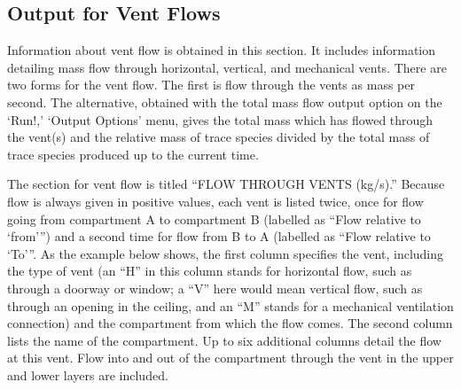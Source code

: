 \subsection{Output for Vent Flows}
Information about vent flow is obtained in this section.  It includes information detailing mass flow through horizontal, vertical, and mechanical vents. There are two forms for the vent flow. The first is flow through the vents as mass per second. The alternative, obtained with the total mass flow output option on the `Run!,' `Output Options' menu, gives the total mass which has flowed through the vent(s) and the relative mass of trace species divided by the total mass of trace species produced up to the current time.

The section for vent flow is titled ``FLOW THROUGH VENTS (kg/s).''  Because flow is always given in positive values, each vent is listed twice, once for flow going from compartment A to compartment B (labelled as ``Flow relative to `from''') and a second time for flow from B to A (labelled as ``Flow relative to `To'''.  As the example below shows, the first column specifies the vent, including the type of vent (an ``H'' in this column stands for horizontal flow, such as through a doorway or window; a ``V'' here would mean vertical flow, such as through an opening in the ceiling, and an ``M'' stands for a mechanical ventilation connection) and the compartment from which the flow comes. The second column lists the name of the compartment. Up to six additional columns detail the flow at this vent. Flow into and out of the compartment through the vent in the upper and lower layers are included.

